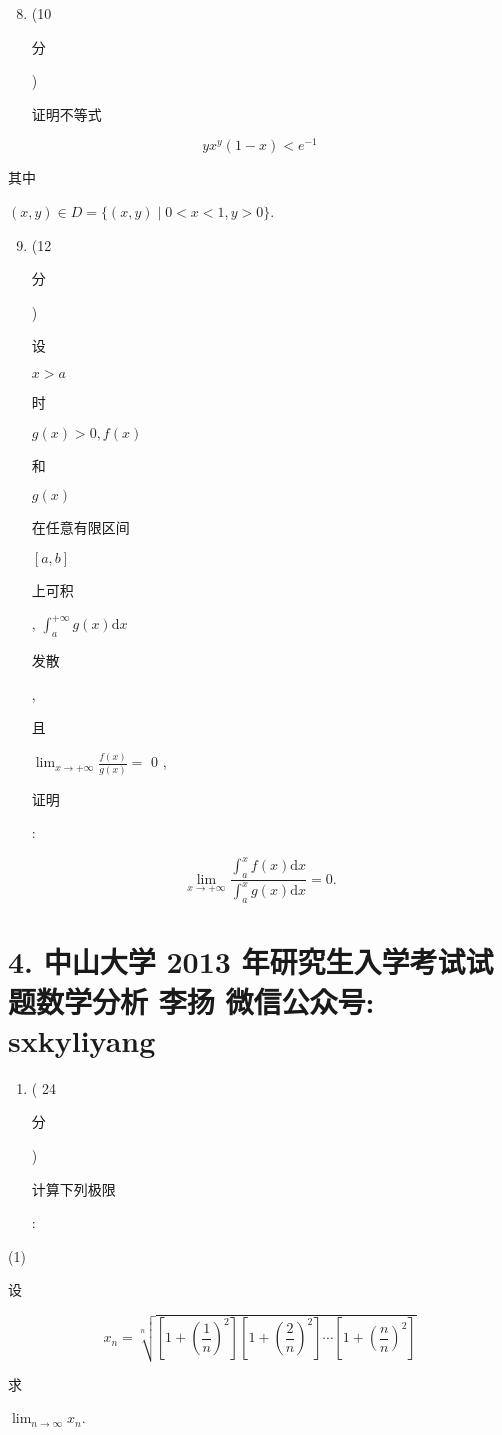 \documentclass[10pt]{article}
\begin{document}
\begin{enumerate}
  \setcounter{enumi}{7}
  \item (10 \begin{CJK}{UTF8}{mj}分\end{CJK}) \begin{CJK}{UTF8}{mj}证明不等式\end{CJK}
\end{enumerate}
$$
y x^{y}(1-x)<e^{-1}
$$
\begin{CJK}{UTF8}{mj}其中\end{CJK} $(x, y) \in D=\{(x, y) \mid 0<x<1, y>0\}$.

\begin{enumerate}
  \setcounter{enumi}{8}
  \item (12 \begin{CJK}{UTF8}{mj}分\end{CJK}) \begin{CJK}{UTF8}{mj}设\end{CJK} $x>a$ \begin{CJK}{UTF8}{mj}时\end{CJK} $g(x)>0, f(x)$ \begin{CJK}{UTF8}{mj}和\end{CJK} $g(x)$ \begin{CJK}{UTF8}{mj}在任意有限区间\end{CJK} $[a, b]$ \begin{CJK}{UTF8}{mj}上可积\end{CJK}, $\int_{a}^{+\infty} g(x) \mathrm{d} x$ \begin{CJK}{UTF8}{mj}发散\end{CJK}, \begin{CJK}{UTF8}{mj}且\end{CJK} $\lim _{x \rightarrow+\infty} \frac{f(x)}{g(x)}=$ 0 , \begin{CJK}{UTF8}{mj}证明\end{CJK}:
\end{enumerate}
$$
\lim _{x \rightarrow+\infty} \frac{\int_{a}^{x} f(x) \mathrm{d} x}{\int_{a}^{x} g(x) \mathrm{d} x}=0 .
$$

\section{4. 中山大学 2013 年研究生入学考试试题数学分析 
 李扬 
 微信公众号: sxkyliyang}
\begin{enumerate}
  \item ( 24 \begin{CJK}{UTF8}{mj}分\end{CJK}) \begin{CJK}{UTF8}{mj}计算下列极限\end{CJK}:
\end{enumerate}
(1) \begin{CJK}{UTF8}{mj}设\end{CJK}
$$
x_{n}=\sqrt[n]{\left[1+\left(\frac{1}{n}\right)^{2}\right]\left[1+\left(\frac{2}{n}\right)^{2}\right] \cdots\left[1+\left(\frac{n}{n}\right)^{2}\right]}
$$
\begin{CJK}{UTF8}{mj}求\end{CJK} $\lim _{n \rightarrow \infty} x_{n}$.
\end{document}
